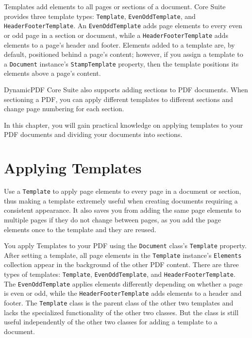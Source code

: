 \documentclass[american,letterpaper]{tufte-book}
\numberwithin{equation}{section}
\numberwithin{figure}{section}
\begin{document}
Templates add elements to all pages or sections of a document. Core
Suite provides three template types: \texttt{Template}, \texttt{EvenOddTemplate},
and \texttt{HeaderFooterTemplate}. An \texttt{EvenOddTemplate} adds
page elements to every even or odd page in a section or document,
while a \texttt{HeaderFooterTemplate} adds elements to a page's header
and footer. Elements added to a template are, by default, positioned
behind a page's content; however, if you assign a template to a \texttt{Document}
instance's \texttt{StampTemplate} property, then the template positions
its elements above a page's content. 

DynamicPDF Core Suite also supports adding sections to PDF documents.
When sectioning a PDF, you can apply different templates to different
sections and change page numbering for each section. 

In this chapter, you will gain practical knowledge on applying templates
to your PDF documents and dividing your documents into sections.

\section{Applying Templates}

Use a \texttt{Template} to apply page elements to every page in a
document or section, thus making a template extremely useful when
creating documents requiring a consistent appearance. It also saves you
from adding the same page elements to multiple pages if they do not
change between pages, as you add the page elements once to the template and they are reused. 

You apply Templates to your PDF using the \texttt{Document} class's
\texttt{Template} property. After setting a template, all page elements
in the \texttt{Template} instance's \texttt{Elements} collection 
appear in the background of the other PDF content. There are three types of templates: \texttt{Template}, \texttt{EvenOddTemplate},
and \texttt{HeaderFooterTemplate}. The \texttt{EvenOddTemplate} applies
elements differently depending on whether a page is even or odd, while
the \texttt{HeaderFooterTemplate} adds elements to a header and footer.
The \texttt{Template} class is the parent class of the other two templates
and lacks the specialized functionality of the other two classes. But the class is still useful independently of the other two classes for adding a template to a document.
\end{document}
